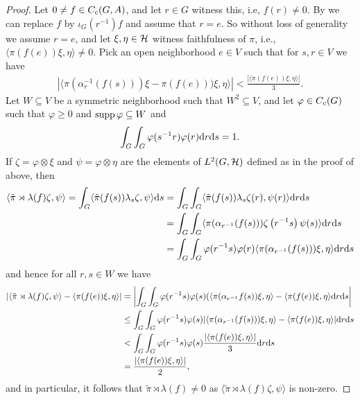\begin{proof}
Let $0 \neq f \in C_c(G,A)$, and let $r \in G$ witness this, i.e, $f(r) \neq 0$. By  we can replace $f$ by $\iota_G(r^{-1})f$ and assume that $r=e$. So without loss of generality we assume $r = e$, and let $\xi, \eta \in \mathcal{H}$ witness faithfulness of $\pi$, i.e., $\langle \pi ( f(e)) \xi, \eta \rangle \neq 0$. Pick an open neighborhood $e \in V$ such that for $s,r \in V$ we have 
\begin{align*}
	| \langle \pi(\alpha_r^{-1}(f(s))) \xi  - \pi(f(e)))\xi , \eta \rangle|  < \frac{| \langle \pi (f(e)) \xi , \eta\rangle|}{3}.
\end{align*}
Let $W \subseteq V$ be a symmetric neighborhood such that $W^2 \subseteq V$, and let $\varphi \in C_c(G)$ such that $\varphi \geq 0$ and $\operatorname{supp} \varphi \subseteq W$ and
\begin{align*}
\int_G \int_G \varphi(s^{-1}r) \varphi(r) \mathrm{d} r \mathrm{d} s = 1.
\end{align*}
If $\zeta = \varphi \otimes \xi$ and $\psi = \varphi \otimes \eta$ are the elements of $L^2(G,\mathcal{H})$ defined as in the proof of  above, then
\begin{align*}
\langle \tilde{ \pi } \rtimes \lambda (f) \zeta, \psi \rangle  =  \int_G \langle \tilde{\pi}(f(s)) \lambda_s \zeta , \psi\rangle \mathrm{d} s &= \int_G \int_G \langle \tilde{\pi} (f(s)) \lambda_s \zeta(r) , \psi(r) \rangle \mathrm{d} r \mathrm{d} s\\
&= \int_G \int_G \langle \pi(\alpha_{r^{-1}}(f(s))) \zeta\left( r^{-1}s \right) \psi(s) \rangle \mathrm{d} r \mathrm{d} s\\
&= \int_G \int_G \varphi(r^{-1}s) \varphi(r) \langle \pi(\alpha_{r^{-1}}(f(s))) \xi , \eta \rangle \mathrm{d} r \mathrm{d} s
\end{align*}
and hence for all $r,s \in W$ we have
\begin{align*}
\left | \langle\tilde{\pi} \rtimes \lambda (f) \zeta , \psi \rangle - \langle \pi(f(e)) \xi , \eta \rangle\right | &=  \left |  \int_G \int_G\varphi(r^{-1}s) \varphi (s) (\langle \pi(\alpha_{r^{-1}} f(s)) \xi , \eta \rangle - \langle \pi(f(e)) \xi , \eta \rangle  \mathrm{d} r \mathrm{d} s \right | \\
&\leq \int_G \int_G \varphi(r^{-1}s ) \varphi (s) | \langle \pi(\alpha_{r^{-1}}(f(s))) \xi , \eta\rangle - \langle \pi(f(e)) \xi , \eta \rangle | \mathrm{d} r \mathrm{d} s \\
&< \int_G \int_G \varphi(r^{-1}s) \varphi(s) \frac{| \langle \pi(f(e)) \xi, \eta \rangle|}{3} \mathrm{d} r \mathrm{d} s \\
&= \frac{| \langle \pi(f(e)) \xi , \eta \rangle|} {2},
\end{align*}
and in particular, it follows that $\tilde{\pi} \rtimes \lambda (f) \neq 0$ as $\langle \tilde \pi \rtimes \lambda(f) \zeta, \psi\rangle$ is non-zero.
\end{proof}

